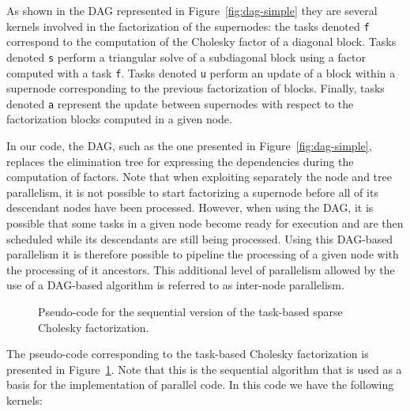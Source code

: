 \documentclass{article}
\begin{document}
As shown in the DAG represented in Figure~\ref{fig:dag-simple} they
are several kernels involved in the factorization of the supernodes:
the tasks denoted \texttt{f} correspond to the computation of the
Cholesky factor of a diagonal block. Tasks denoted \texttt{s} perform
a triangular solve of a subdiagonal block using a factor computed with
a task \texttt{f}. Tasks denoted \texttt{u} perform an update of a
block within a supernode corresponding to the previous factorization
of blocks. Finally, tasks denoted \texttt{a} represent the update
between supernodes with respect to the factorization blocks computed
in a given node.

In our code, the DAG, such as the one presented in
Figure~\ref{fig:dag-simple}, replaces the elimination tree for
expressing the dependencies during the computation of factors. Note
that when exploiting separately the node and tree parallelism, it is
not possible to start factorizing a supernode before all of its
descendant nodes have been processed. However, when using the DAG, it is
possible that some tasks in a given node become ready for execution
and are then scheduled while its descendants are still being
processed. Using this DAG-based parallelism it is therefore possible
to pipeline the processing of a given node with the processing of it
ancestors. This additional level of parallelism allowed by the use of
a DAG-based algorithm is referred to as inter-node parallelism.

\begin{figure}[!h]
  \centering 
\caption{\label{fig:spllt-facto-seq-pseudocode}Pseudo-code for the
  sequential version of the task-based sparse Cholesky factorization.}
\end{figure}

The pseudo-code corresponding to the task-based Cholesky factorization
is presented in Figure~\ref{fig:spllt-facto-seq-pseudocode}. Note that
this is the sequential algorithm that is used as a basis for the
implementation of parallel code. In this code we have the following
kernels:
\end{document}
